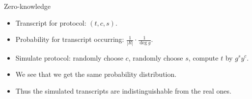 \begin{frame}
  \begin{block}{Zero-knowledge}
    \begin{itemize}
      \item Transcript for protocol: \((t, c, s)\).

      \item Probability for transcript occurring: \(\frac{1}{|R|}\cdot 
          \frac{1}{\deg g}\).

        \pause{}

      \item Simulate protocol: randomly choose \(c\), randomly choose \(s\), 
        compute \(t\) by \(g^s y^c\).

        \pause{}

      \item We see that we get the same probability distribution.
      \item Thus the simulated transcripts are indistinguishable from the real 
        ones.
    \end{itemize}
  \end{block}
\end{frame}



\begin{frame}[allowframebreaks]
  \printbibliography{}
\end{frame}

